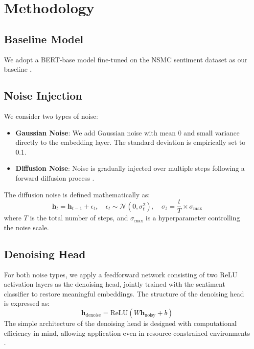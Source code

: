 \documentclass{article}
\begin{document}
\section{Methodology}
\subsection{Baseline Model}
We adopt a BERT-base model fine-tuned on the NSMC sentiment dataset as our baseline \cite{devlin2019, liu2019}.

\subsection{Noise Injection}
We consider two types of noise:
\begin{itemize}
\item \textbf{Gaussian Noise}: We add Gaussian noise with mean 0 and small variance directly to the embedding layer. The standard deviation is empirically set to 0.1.
\item \textbf{Diffusion Noise}: Noise is gradually injected over multiple steps following a forward diffusion process \cite{ho2020, song2020}.
\end{itemize}

The diffusion noise is defined mathematically as:
\begin{equation}
\mathbf{h}_t = \mathbf{h}_{t-1} + \epsilon_t, \quad \epsilon_t \sim \mathcal{N}(0, \sigma_t^2), \quad \sigma_t = \frac{t}{T} \times \sigma_{\text{max}}
\end{equation}
where $T$ is the total number of steps, and $\sigma_{\text{max}}$ is a hyperparameter controlling the noise scale.

\subsection{Denoising Head}
For both noise types, we apply a feedforward network consisting of two ReLU activation layers as the denoising head, jointly trained with the sentiment classifier to restore meaningful embeddings. The structure of the denoising head is expressed as:
\begin{equation}
\mathbf{h}_{\text{denoise}} = \text{ReLU}(W \mathbf{h}_{\text{noisy}} + b)
\end{equation}
The simple architecture of the denoising head is designed with computational efficiency in mind, allowing application even in resource-constrained environments \cite{sun2020mobilebert, lan2019albert}.
\end{document}
